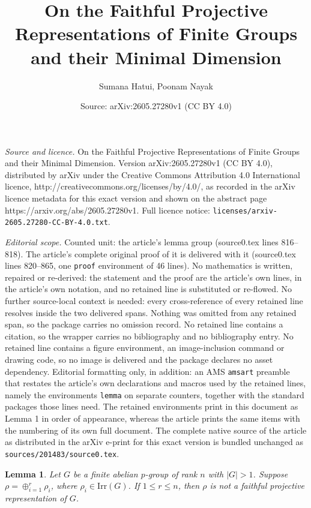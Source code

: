 \documentclass[10pt,a4paper]{amsart}
\title{On the Faithful Projective Representations of Finite Groups and their Minimal Dimension}
\author{Sumana Hatui, Poonam Nayak}
\date{Source: arXiv:2605.27280v1 (CC BY 4.0)}
\newtheorem{lemma}{Lemma}
\begin{document}
\maketitle

\noindent\emph{Source and licence.} On the Faithful Projective Representations of Finite Groups and their Minimal Dimension. Version arXiv:2605.27280v1 (CC BY 4.0), distributed by arXiv under the Creative Commons Attribution 4.0 International licence, http://creativecommons.org/licenses/by/4.0/, as recorded in the arXiv licence metadata for this exact version and shown on the abstract page https://arxiv.org/abs/2605.27280v1. Full licence notice: \texttt{licenses/arxiv-2605.27280-CC-BY-4.0.txt}.\par\smallskip

\noindent\textit{Editorial scope.} Counted unit: the article's lemma group (source0.tex lines 816--818). The article's complete original proof of it is delivered with it (source0.tex lines 820--865, one \texttt{proof} environment of 46 lines). No mathematics is written, repaired or re-derived: the statement and the proof are the article's own lines, in the article's own notation, and no retained line is substituted or re-flowed.  No further source-local context is needed: every cross-reference of every retained line resolves inside the two delivered spans.  Nothing was omitted from any retained span, so the package carries no omission record.  No retained line contains a citation, so the wrapper carries no bibliography and no bibliography entry.  No retained line contains a figure environment, an image-inclusion command or drawing code, so no image is delivered and the package declares no asset dependency.  Editorial formatting only, in addition: an AMS \texttt{amsart} preamble that restates the article's own declarations and macros used by the retained lines, namely the environments \texttt{lemma} on separate counters, together with the standard packages those lines need.  The retained environments print in this document as Lemma 1 in order of appearance, whereas the article prints the same items with the numbering of its own full document.  The complete native source of the article as distributed in the arXiv e-print for this exact version is bundled unchanged as \texttt{sources/201483/source0.tex}.
\begin{lemma} \label{1dim direct sum in abelian group}
	Let $G$ be a finite abelian $p$-group of rank $n$ with $|G|>1$. Suppose $\rho= \oplus_{i=1}^r \rho_i$, where $\rho_i \in \mathrm{Irr}(G)$. If $1 \leq r \leq n$, then $\rho$ is not a faithful projective representation of $G$.   
\end{lemma}
\end{document}
